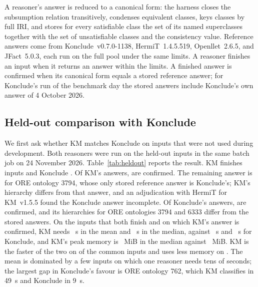 A reasoner's answer is reduced to a canonical form: the harness closes the
subsumption relation transitively, condenses equivalent classes, keys classes
by full IRI, and stores for every satisfiable class the set of its named
superclasses together with the set of unsatisfiable classes and the
consistency value.  Reference answers come from Konclude~v0.7.0-1138,
HermiT~1.4.5.519, Openllet~2.6.5, and JFact~5.0.3, each run on the full pool
under the same limits.  A reasoner finishes an input when it returns an answer
within the limits.  A finished answer is confirmed when its canonical form
equals a stored reference answer; for Konclude's run of the benchmark day the
stored answers include Konclude's own answer of 4 October 2026.

\subsection{Held-out comparison with Konclude}
\label{sec:eval-heldout}

We first ask whether KM matches Konclude on inputs that were not used during
development.  Both reasoners were run on the \HOInputs{} held-out inputs in
the same batch job on 24 November 2026.  Table~\ref{tab:heldout} reports the
result.  KM finishes \HOKMSolved{} inputs and Konclude \HOKCSolved{}.  Of KM's
answers, \HOKMConfirmed{} are confirmed.  The remaining answer is for ORE
ontology 3794, whose only stored reference answer is Konclude's; KM's
hierarchy differs from that answer, and an adjudication with HermiT for
KM~v1.5.5 found the Konclude answer incomplete.  Of Konclude's answers,
\HOKCConfirmed{} are confirmed, and its hierarchies for ORE ontologies 3794
and 6333 differ from the stored answers.  On the \HOCommonKMKC{} inputs that
both finish and on which KM's answer is confirmed, KM needs \HOKMMean{}~s in the mean and
\HOKMMedian{}~s in the median, against \HOKCMean{}~s and \HOKCMedian{}~s for
Konclude, and KM's peak memory is \HOKMMemMedian{}~MiB in the median against
\HOKCMemMedian{}~MiB.  KM is the faster of the two on \HOKMFaster{} of the
\HOCommonKMKC{} common inputs and uses less memory on \HOKMSmaller{}.  The
mean is dominated by a few inputs on which one reasoner needs tens of
seconds; the largest gap in Konclude's favour is ORE ontology 762, which KM
classifies in 49~s and Konclude in 9~s.

